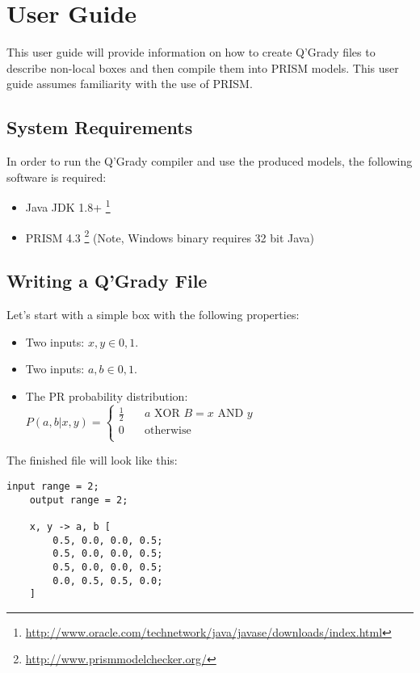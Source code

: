 \documentclass[report.tex]{subfiles}
\begin{document}
\chapter{User Guide} %
\label{cha:user_guide}
This user guide will provide information on how to create Q'Grady files to
describe non-local boxes and then compile them into PRISM models. This user
guide assumes familiarity with the use of PRISM.

\section{System Requirements} %
\label{sec:system_requirements}
In order to run the Q'Grady compiler and use the produced models, the following
software is required:

\begin{itemize}
    \item Java JDK 1.8+ \footnote{\url{http://www.oracle.com/technetwork/java/javase/downloads/index.html}}
    \item PRISM 4.3 \footnote{\url{http://www.prismmodelchecker.org/}} (Note, Windows binary requires 32 bit Java)
\end{itemize}

\section{Writing a Q'Grady File} %
\label{sec:writing_a_q_grady_file}
Let's start with a simple box with the following properties:
\begin{itemize}
    \item Two inputs: \(x, y \in {0, 1}\).
    \item Two inputs: \(a, b \in {0, 1}\).
    \item The PR probability distribution:
    \(
        P(a, b | x, y) = 
        \begin{cases}
            \frac{1}{2} & \quad a \text{ XOR } B = x \text{ AND } y \\
            0 & \quad \text{otherwise} \\
        \end{cases}
    \)
\end{itemize}

The finished file will look like this:

\begin{lstlisting}[frame = single]
    input range = 2;
    output range = 2;

    x, y -> a, b [
        0.5, 0.0, 0.0, 0.5;
        0.5, 0.0, 0.0, 0.5;
        0.5, 0.0, 0.0, 0.5;
        0.0, 0.5, 0.5, 0.0;
    ]
\end{lstlisting}
\end{document}

